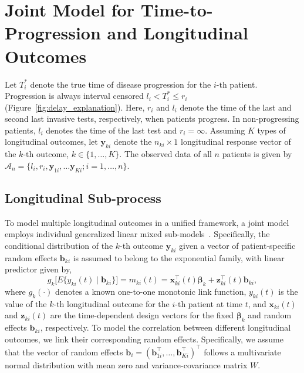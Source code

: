 \section{Joint Model for Time-to-Progression and Longitudinal Outcomes}
\label{sec:jointmodel}
Let $T_i^*$ denote the true time of disease progression for the ${i\mbox{-th}}$ patient. Progression is always interval censored ${l_i < T_i^* \leq r_i}$ (Figure~\ref{fig:delay_explanation}). Here, $r_i$ and $l_i$ denote the time of the last and second last invasive tests, respectively, when patients progress. In non-progressing patients, $l_i$ denotes the time of the last test and ${r_i=\infty}$. Assuming $K$ types of longitudinal outcomes, let $\boldsymbol{y}_{ki}$ denote the ${n_{ki} \times 1}$ longitudinal response vector of the ${k\mbox{-th}}$ outcome, $k \in \{1, \ldots, K\}$. The observed data of all $n$ patients is given by ${\mathcal{A}_n = \{l_i, r_i, \boldsymbol{y}_{1i},\ldots \boldsymbol{y}_{Ki}; i = 1, \ldots, n\}}$.

\subsection{Longitudinal Sub-process}
To model multiple longitudinal outcomes in a unified framework, a joint model employs individual generalized linear mixed sub-models~\citep{mcculloch2005generalized}. Specifically, the conditional distribution of the $k$-th outcome $\boldsymbol{y}_{ki}$ given a vector of patient-specific random effects $\boldsymbol{b}_{ki}$ is assumed to belong to the exponential family, with linear predictor given by,
\begin{equation*}
\label{eq:long_model}
g_k\big[E\{y_{ki} (t) \mid \boldsymbol{b}_{ki}\}\big] = m_{ki}(t) = \boldsymbol{x}_{ki}^{\top}(t)\boldsymbol{\beta}_{k} + \boldsymbol{z}_{ki}^{\top}(t)\boldsymbol{b}_{ki},
\end{equation*}
where $g_k(\cdot)$ denotes a known one-to-one monotonic link function, $y_{ki}(t)$ is the
value of the ${k\mbox{-th}}$ longitudinal outcome for the ${i\mbox{-th}}$ patient at time $t$, and $\boldsymbol{x}_{ki}(t)$ and $\boldsymbol{z}_{ki}(t)$ are the time-dependent design vectors for the fixed $\boldsymbol{\beta}_{k}$ and random effects $\boldsymbol{b}_{ki}$, respectively. To model the correlation between different longitudinal outcomes, we link their corresponding random effects. Specifically, we assume that the vector of random effects ${\boldsymbol{b}_{i} = (\boldsymbol{b}_{1i}^{\top}, \ldots, \boldsymbol{b}_{Ki}^{\top})^{\top}}$ follows a multivariate normal distribution with mean zero and variance-covariance matrix $W$.

